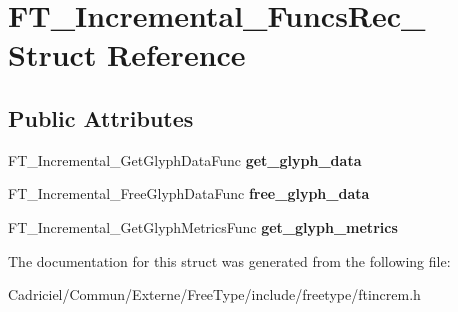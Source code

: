 \hypertarget{struct_f_t___incremental___funcs_rec__}{}\section{F\+T\+\_\+\+Incremental\+\_\+\+Funcs\+Rec\+\_\+ Struct Reference}
\label{struct_f_t___incremental___funcs_rec__}
\subsection*{Public Attributes}
\begin{DoxyCompactItemize}
\item 
F\+T\+\_\+\+Incremental\+\_\+\+Get\+Glyph\+Data\+Func {\bfseries get\+\_\+glyph\+\_\+data}\hypertarget{struct_f_t___incremental___funcs_rec___ac276b7ff9624b8d8bf144ab8d00538b4}{}\label{struct_f_t___incremental___funcs_rec___ac276b7ff9624b8d8bf144ab8d00538b4}

\item 
F\+T\+\_\+\+Incremental\+\_\+\+Free\+Glyph\+Data\+Func {\bfseries free\+\_\+glyph\+\_\+data}\hypertarget{struct_f_t___incremental___funcs_rec___a9201afcfda8c15be839aee04306dff0a}{}\label{struct_f_t___incremental___funcs_rec___a9201afcfda8c15be839aee04306dff0a}

\item 
F\+T\+\_\+\+Incremental\+\_\+\+Get\+Glyph\+Metrics\+Func {\bfseries get\+\_\+glyph\+\_\+metrics}\hypertarget{struct_f_t___incremental___funcs_rec___ac7d95e85357ab9d1893660b0628c1908}{}\label{struct_f_t___incremental___funcs_rec___ac7d95e85357ab9d1893660b0628c1908}

\end{DoxyCompactItemize}


The documentation for this struct was generated from the following file\+:\begin{DoxyCompactItemize}
\item 
Cadriciel/\+Commun/\+Externe/\+Free\+Type/include/freetype/ftincrem.\+h\end{DoxyCompactItemize}

